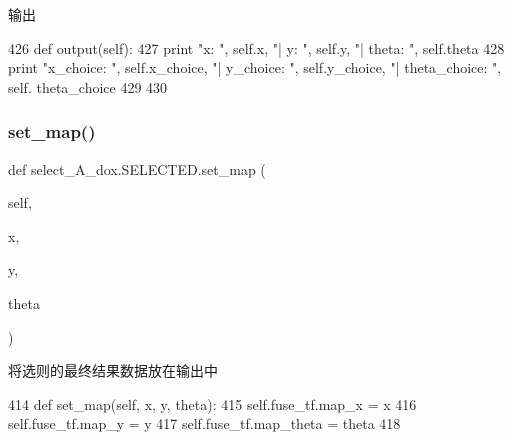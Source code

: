 输出 


\begin{DoxyCode}
426     \textcolor{keyword}{def }output(self):
427         \textcolor{keywordflow}{print} \textcolor{stringliteral}{"x: "}, self.x, \textcolor{stringliteral}{"| y: "}, self.y, \textcolor{stringliteral}{"| theta: "}, self.theta
428         \textcolor{keywordflow}{print} \textcolor{stringliteral}{"x\_choice: "}, self.x\_choice, \textcolor{stringliteral}{"| y\_choice: "}, self.y\_choice, \textcolor{stringliteral}{"| theta\_choice: "}, self.
      theta\_choice
429 
430 
\end{DoxyCode}
\mbox{\label{classselect___a__dox_1_1_s_e_l_e_c_t_e_d_a5ecef7f1fa601e80a826e5247a77d6cd}} 
\subsubsection{\texorpdfstring{set\+\_\+map()}{set\_map()}}
{\footnotesize\ttfamily def select\+\_\+\+A\+\_\+dox.\+S\+E\+L\+E\+C\+T\+E\+D.\+set\+\_\+map (\begin{DoxyParamCaption}\item[{}]{self,  }\item[{}]{x,  }\item[{}]{y,  }\item[{}]{theta }\end{DoxyParamCaption})}



将选则的最终结果数据放在输出中 


\begin{DoxyCode}
414     \textcolor{keyword}{def }set\_map(self, x, y, theta):
415         self.fuse\_tf.map\_x = x
416         self.fuse\_tf.map\_y = y
417         self.fuse\_tf.map\_theta = theta
418 
\end{DoxyCode}
\mbox{\label{classselect___a__dox_1_1_s_e_l_e_c_t_e_d_a996f8d2a606054a06cf2b9ab55ec92e1}} 
